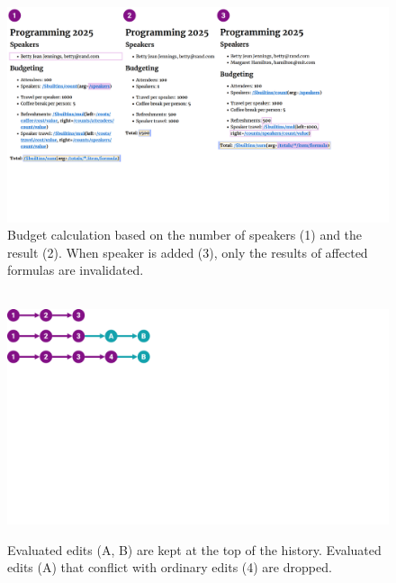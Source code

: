 \documentclass[sigconf]{acmart}
\begin{document}

\begin{figure}[t]
  \includegraphics[width=1\columnwidth,clip,trim=0.1cm 5cm 5.1cm 0cm]{fig/incremental.pdf}
  \caption{Budget calculation based on the number of speakers (1) and the result (2). When speaker
  is added (3), only the results of affected formulas are invalidated.}
  \label{fig:incremental}
  \vspace{-1em}
\end{figure}



\begin{figure}[h]
\centering
\begin{minipage}{0.55\columnwidth}
  ~\\[1em]
  \includegraphics[width=0.9\columnwidth,clip,trim=0cm 14cm 21cm 0cm]{fig/eval.pdf}
  \end{minipage}%
  \begin{minipage}{0.45\columnwidth}
    \caption{Evaluated edits (A, B) are kept at the top of the history. Evaluated edits (A)
      that conflict with ordinary edits (4) are dropped.}
    \label{fig:eval}
  \end{minipage}
\end{figure}
\end{document}
